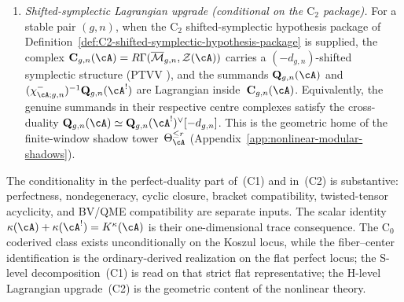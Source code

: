 \begin{enumerate}[label=\textup{(C\arabic*)},start=0]
\item \emph{Shifted-symplectic Lagrangian upgrade
 \textup{(}conditional on the $\mathrm{C}_2$ package\textup{)}.}\;
 For a stable pair \((g,n)\), when the $\mathrm{C}_2$
 shifted-symplectic hypothesis package of
 Definition~\textup{\ref{def:C2-shifted-symplectic-hypothesis-package}}
 is supplied, the complex
 $\mathbf{C}_{g,n}(\cA) = R\Gamma(\overline{\mathcal{M}}_{g,n},
 \mathcal{Z}(\cA))$ carries a $(-d_{g,n})$-shifted symplectic
 structure \textup{(}PTVV
 \cite{PTVV13}\textup{)}, and the summands
 $\mathbf{Q}_{g,n}(\cA)$ and
 $(\chi^-_{\cA;g,n})^{-1}\mathbf{Q}_{g,n}(\cA^!)$ are Lagrangian
 inside~$\mathbf C_{g,n}(\cA)$.  Equivalently, the genuine summands in
 their respective centre complexes satisfy the cross-duality
 $\mathbf{Q}_{g,n}(\cA) \simeq
 \mathbf{Q}_{g,n}(\cA^!)^\vee[-d_{g,n}]$.
 This is the geometric home of the finite-window shadow
 tower~$\Theta_{\cA}^{\leq r}$
 \textup{(}Appendix~\textup{\ref{app:nonlinear-modular-shadows})}.
\end{enumerate}
The conditionality in the perfect-duality part of~(C1) and in~(C2)
is substantive:
perfectness, nondegeneracy, cyclic closure, bracket compatibility,
twisted-tensor acyclicity, and BV/QME compatibility are separate
inputs.  The scalar identity
$\kappa(\cA)+\kappa(\cA^!)=K^\kappa(\cA)$ is their
one-dimensional trace consequence.
The $\mathrm{C}_0$ coderived class exists unconditionally on the
Koszul locus, while the fiber--center identification is the
ordinary-derived realization on the flat perfect locus; the
S-level decomposition~(C1) is read on that strict flat
representative; the H-level Lagrangian upgrade~(C2) is the
geometric content of the nonlinear theory.

